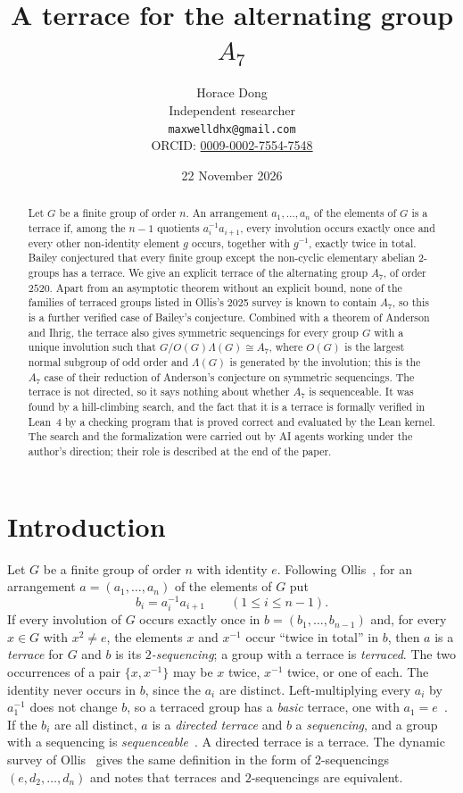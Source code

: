 \documentclass[11pt]{article}
\title{A terrace for the alternating group $A_7$}
\author{Horace Dong\\ \small Independent researcher\\
\small\texttt{maxwelldhx@gmail.com}\\
\small ORCID: \href{https://orcid.org/0009-0002-7554-7548}{0009-0002-7554-7548}}
\date{22 November 2026}
\theoremstyle{definition}
\theoremstyle{remark}
\begin{document}
\maketitle

\begin{abstract}
Let $G$ be a finite group of order $n$. An arrangement $a_1,\dots,a_n$ of the
elements of $G$ is a terrace if, among the $n-1$ quotients
$a_i^{-1}a_{i+1}$, every involution occurs exactly once and every other
non-identity element $g$ occurs, together with $g^{-1}$, exactly twice in
total. Bailey conjectured that every finite group except the non-cyclic
elementary abelian $2$-groups has a terrace. We give an explicit terrace of
the alternating group $A_7$, of order $2520$. Apart from an asymptotic theorem
without an explicit bound, none of the families of terraced groups listed in Ollis's 2025 survey is known to contain $A_7$, so this is a further verified case of Bailey's
conjecture. Combined with a theorem of Anderson and Ihrig, the terrace also
gives symmetric sequencings for every group $G$ with a unique involution such
that $G/O(G)\Lambda(G)\cong A_7$, where $O(G)$ is the largest normal subgroup
of odd order and $\Lambda(G)$ is generated by the involution; this is the
$A_7$ case of their reduction of Anderson's conjecture on symmetric
sequencings. The terrace
is not directed, so it says nothing about whether $A_7$ is sequenceable. It
was found by a hill-climbing search, and the fact that it is a terrace is
formally verified in Lean~4 by a checking program that is proved correct and
evaluated by the Lean kernel. The search and the formalization were carried
out by AI agents working under the author's direction; their role is described
at the end of the paper.
\end{abstract}

\section{Introduction}

Let $G$ be a finite group of order $n$ with identity $e$. Following
Ollis~\cite[Section~1]{ollis16}, for an arrangement $a=(a_1,\dots,a_n)$ of the
elements of $G$ put
\[
b_i=a_i^{-1}a_{i+1}\qquad(1\le i\le n-1).
\]
If every involution of $G$ occurs exactly once in $b=(b_1,\dots,b_{n-1})$ and,
for every $x\in G$ with $x^2\ne e$, the elements $x$ and $x^{-1}$ occur
``twice in total'' in $b$, then $a$ is a \emph{terrace} for $G$ and $b$ is its
\emph{$2$-sequencing}; a group with a terrace is \emph{terraced}. The two
occurrences of a pair $\{x,x^{-1}\}$ may be $x$ twice, $x^{-1}$ twice, or one
of each. The identity never occurs in $b$, since the $a_i$ are distinct.
Left-multiplying every $a_i$ by $a_1^{-1}$ does not change $b$, so a terraced
group has a \emph{basic} terrace, one with $a_1=e$~\cite[p.~2]{ollis16}. If
the $b_i$ are all distinct, $a$ is a \emph{directed terrace} and $b$ a
\emph{sequencing}, and a group with a sequencing is
\emph{sequenceable}~\cite[Section~1]{ollis16}. A directed terrace is a terrace.
The dynamic survey of Ollis~\cite[Sections~2.3 and~3.4]{survey} gives the
same definition in the form of $2$-sequencings $(e,d_2,\dots,d_n)$ and notes
that terraces and $2$-sequencings are equivalent.
\end{document}
